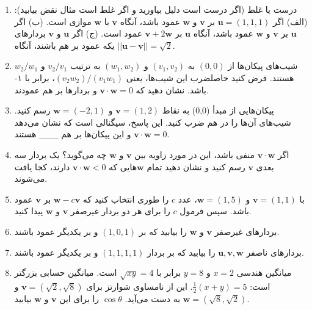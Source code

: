 \documentclass[12pt, a4paper]{book}
\begin{document}
\begin{enumerate}
		(ج) $\mathbf{v}=\begin{bmatrix} 1 \\ \sqrt{3} \end{bmatrix}, \mathbf{w}=\begin{bmatrix} -1 \\ \sqrt{3} \end{bmatrix}$ \quad (د) $\mathbf{v}=\begin{bmatrix} 3 \\ 1 \end{bmatrix}, \mathbf{w}=\begin{bmatrix} -1 \\ -2 \end{bmatrix}$
		\item درست یا غلط (اگر درست است دلیل بیاورید و اگر غلط است مثال نقض بیابید):
		(الف) اگر $\mathbf{u}=(1,1,1)$ بر $\mathbf{v}$ و $\mathbf{w}$ عمود باشد، آنگاه $\mathbf{v}$ با $\mathbf{w}$ موازی است.
		(ب) اگر $\mathbf{u}$ بر $\mathbf{v}$ و $\mathbf{w}$ عمود باشد، آنگاه $\mathbf{u}$ بر $\mathbf{v}+2\mathbf{w}$ عمود است.
		(ج) اگر $\mathbf{u}$ و $\mathbf{v}$ بردارهای یکه عمود بر هم باشند، آنگاه $||\mathbf{u}-\mathbf{v}||=\sqrt{2}$.
		\item شیب‌های پیکان‌ها از $(0,0)$ به $(v_1, v_2)$ و $(w_1, w_2)$ به ترتیب $v_2/v_1$ و $w_2/w_1$ هستند. فرض کنید حاصلضرب این شیب‌ها، یعنی $(v_2w_2)/(v_1w_1)$، برابر با ۱- باشد. نشان دهید که $\mathbf{v}\cdot\mathbf{w}=0$ و بردارها بر هم عمودند.
		\item پیکان‌هایی از مبدأ (0,0) به نقاط $\mathbf{v}=(1,2)$ و $\mathbf{w}=(-2,1)$ رسم کنید. شیب‌های آن‌ها را در هم ضرب کنید. این پاسخ، سیگنالی است که نشان می‌دهد $\mathbf{v} \cdot \mathbf{w} = 0$ و این پیکان‌ها بر هم \_\_\_ هستند.
		\item اگر $\mathbf{v}\cdot\mathbf{w}$ منفی باشد، این در مورد زاویه بین $\mathbf{v}$ و $\mathbf{w}$ چه می‌گوید؟ یک بردار سه بعدی $\mathbf{v}$ رسم کنید و نشان دهید تمام $\mathbf{w}$هایی که $\mathbf{v}\cdot\mathbf{w}<0$ دارند، کجا یافت می‌شوند.
		\item با $\mathbf{v}=(1,1)$ و $\mathbf{w}=(1,5)$، عدد $c$ را طوری انتخاب کنید که $\mathbf{w}-c\mathbf{v}$ بر $\mathbf{v}$ عمود باشد. سپس فرمول $c$ را برای هر دو بردار غیرصفر $\mathbf{v}$ و $\mathbf{w}$ پیدا کنید.
		\item بردارهای غیرصفر $\mathbf{v}$ و $\mathbf{w}$ را بیابید که بر $(1,0,1)$ و بر یکدیگر عمود باشند.
		\item بردارهای ناصفر $\mathbf{u}, \mathbf{v}, \mathbf{w}$ را بیابید که بر بردار $(1, 1, 1, 1)$ و بر یکدیگر عمود باشند.
		\item میانگین هندسی $x=2$ و $y=8$ برابر با $\sqrt{xy}=4$ است. میانگین حسابی بزرگتر است: $\frac{1}{2}(x+y)=5$. این از نامساوی شوارتز برای $\mathbf{v}=(\sqrt{2}, \sqrt{8})$ و $\mathbf{w}=(\sqrt{8}, \sqrt{2})$ به دست می‌آید. $\cos\theta$ را برای این $\mathbf{v}$ و $\mathbf{w}$ بیابید.

\end{enumerate}
\end{document}
